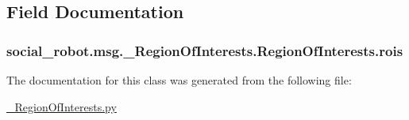 \subsection{Field Documentation}
\hypertarget{classsocial__robot_1_1msg_1_1__RegionOfInterests_1_1RegionOfInterests_a8a3a7cdebdf6d59f6608ffe93a8d6853}{
\subsubsection[{rois}]{\setlength{\rightskip}{0pt plus 5cm}social\-\_\-robot.\-msg.\-\_\-\-Region\-Of\-Interests.\-Region\-Of\-Interests.\-rois}}\label{classsocial__robot_1_1msg_1_1__RegionOfInterests_1_1RegionOfInterests_a8a3a7cdebdf6d59f6608ffe93a8d6853}


The documentation for this class was generated from the following file\-:\begin{DoxyCompactItemize}
\item 
\hyperlink{__RegionOfInterests_8py}{\-\_\-\-Region\-Of\-Interests.\-py}\end{DoxyCompactItemize}
